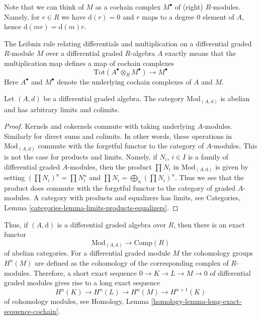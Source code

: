 \noindent
Note that we can think of $M$ as a cochain complex $M^\bullet$
of (right) $R$-modules. Namely, for $r \in R$ we have $\text{d}(r) = 0$
and $r$ maps to a degree $0$ element of $A$, hence
$\text{d}(mr) = \text{d}(m)r$.

\medskip\noindent
The Leibniz rule relating differentials and multiplication on a differential
graded $R$-module $M$ over a differential graded $R$-algebra $A$
exactly means that the multiplication map defines a map of cochain complexes
$$
\text{Tot}(A^\bullet \otimes_R M^\bullet) \to M^\bullet
$$
Here $A^\bullet$ and $M^\bullet$ denote the underlying cochain complexes
of $A$ and $M$.

\begin{lemma}
\label{lemma-dgm-abelian}
Let $(A, d)$ be a differential graded algebra. The category
$\text{Mod}_{(A, \text{d})}$ is abelian and has arbitrary limits and colimits.
\end{lemma}

\begin{proof}
Kernels and cokernels commute with taking underlying $A$-modules.
Similarly for direct sums and colimits. In other words, these operations
in $\text{Mod}_{(A, \text{d})}$ commute with the forgetful functor to the
category of $A$-modules. This is not the case for products and limits.
Namely, if $N_i$, $i \in I$ is a family of
differential graded $A$-modules, then the product $\prod N_i$ in
$\text{Mod}_{(A, \text{d})}$ is given by setting $(\prod N_i)^n = \prod N_i^n$
and $\prod N_i = \bigoplus_n (\prod N_i)^n$. Thus we see that the product
does commute with the forgetful functor to the category of graded $A$-modules.
A category with products and equalizers has limits, see
Categories, Lemma \ref{categories-lemma-limits-products-equalizers}.
\end{proof}

\noindent
Thus, if $(A, \text{d})$ is a differential graded
algebra over $R$, then there is an exact functor
$$
\text{Mod}_{(A, \text{d})} \longrightarrow \text{Comp}(R)
$$
of abelian categories. For a differential graded module $M$ the
cohomology groups $H^n(M)$ are defined as the cohomology of the
corresponding complex of $R$-modules. Therefore, a short exact
sequence $0 \to K \to L \to M \to 0$ of differential graded modules
gives rise to a long exact sequence
\begin{equation}
\label{equation-les}
H^n(K) \to H^n(L) \to H^n(M) \to H^{n + 1}(K)
\end{equation}
of cohomology modules, see
Homology, Lemma \ref{homology-lemma-long-exact-sequence-cochain}.

